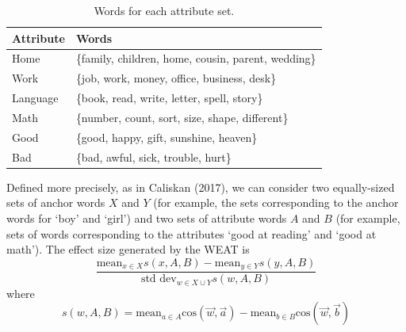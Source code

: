 \documentclass[10pt, letterpaper]{article}
\begin{document}
\begin{table}

\caption{\label{tab:xtable}Words for each attribute set.}
\centering
\begin{tabular}[t]{l>{\raggedright\arraybackslash}p{2in}}
\toprule
Attribute & Words\\
\midrule
Home & \{family, children, home, cousin, parent, wedding\}\\
Work & \{job, work, money, office, business, desk\}\\
Language & \{book, read, write, letter, spell, story\}\\
Math & \{number, count, sort, size, shape, different\}\\
Good & \{good, happy, gift, sunshine, heaven\}\\
\addlinespace
Bad & \{bad, awful, sick, trouble, hurt\}\\
\bottomrule
\end{tabular}
\end{table}

Defined more precisely, as in Caliskan (2017), we can consider two
equally-sized sets of anchor words \(X\) and \(Y\) (for example, the
sets corresponding to the anchor words for `boy' and `girl') and two
sets of attribute words \(A\) and \(B\) (for example, sets of words
corresponding to the attributes `good at reading' and `good at math').
The effect size generated by the WEAT is
\[\frac{\text{mean}_{x \in X}s(x, A, B) - \text{mean}_{y \in Y}s(y, A, B)}{\text{std dev}_{w \in X \cup Y}s(w, A, B)}\]
where
\[s(w, A, B) = \text{mean}_{a \in A}\text{cos}(\vec{w}, \vec{a}) - \text{mean}_{b \in B}\text{cos}(\vec{w}, \vec{b})\]
\end{document}
